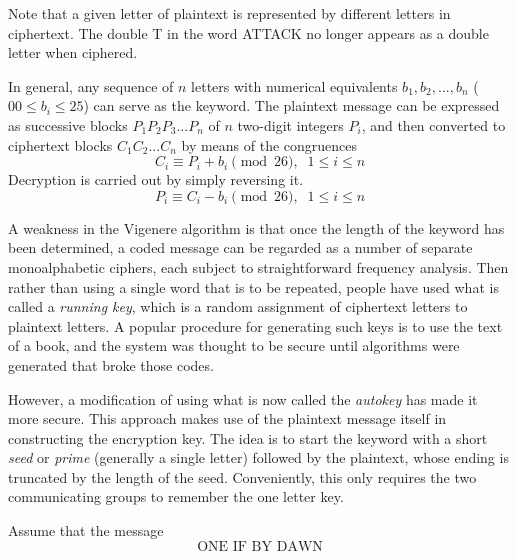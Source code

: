\documentclass{article}
\newcounter{code}[section]
\begin{document}
Note that a given letter of plaintext is represented by different letters in ciphertext. The double T in the word ATTACK no longer appears as a double letter when ciphered. 

In general, any sequence of $n$ letters with numerical equivalents $b_1, b_2, ..., b_n$ ($00\leq b_i \leq 25$) can serve as the keyword. The plaintext message can be expressed as successive blocks $P_1 P_2 P_3 ... P_n$ of $n$ two-digit integers $P_i$, and then converted to ciphertext blocks $C_1 C_2 ... C_n$ by means of the congruences 
\begin{equation}
  C_i \equiv P_i + b_i \pmod{26}, \;\; 1 \leq i \leq n
\end{equation}
Decryption is carried out by simply reversing it. 
\begin{equation}
  P_i \equiv C_i - b_i \pmod{26}, \;\; 1 \leq i \leq n
\end{equation}

A weakness in the Vigenere algorithm is that once the length of the keyword has been determined, a coded message can be regarded as a number of separate monoalphabetic ciphers, each subject to straightforward frequency analysis. Then rather than using a single word that is to be repeated, people have used what is called a \textit{running key}, which is a random assignment of ciphertext letters to plaintext letters. A popular procedure for generating such keys is to use the text of a book, and the system was thought to be secure until algorithms were generated that broke those codes. 

However, a modification of using what is now called the \textit{autokey} has made it more secure. This approach makes use of the plaintext message itself in constructing the encryption key. The idea is to start the keyword with a short \textit{seed} or \textit{prime} (generally a single letter) followed by the plaintext, whose ending is truncated by the length of the seed. Conveniently, this only requires the two communicating groups to remember the one letter key. 

Assume that the message 
\begin{equation}
  \text{ONE IF BY DAWN}
\end{equation}
 
\end{document}
